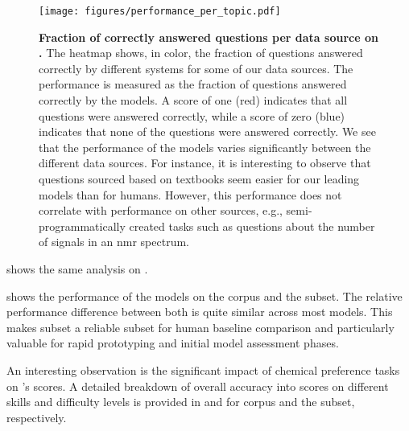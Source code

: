 \begin{figure}[htb]
    \centering
    \texttt{[image: figures/performance\_per\_topic.pdf]}
    \caption{\textbf{Fraction of correctly answered questions per data source on \chembenchmini.} The heatmap shows, in color, the fraction of questions answered correctly by different systems for some of our data sources. The performance is measured as the fraction of questions answered correctly by the models. A score of one (red) indicates that all questions were answered correctly, while a score of zero (blue) indicates that none of the questions were answered correctly.
        We see that the performance of the models varies significantly between the different data sources. For instance, it is interesting to observe that questions sourced based on textbooks seem easier for our leading models than for humans. However, this performance does not correlate with performance on other sources, e.g., semi-programmatically created tasks such as questions about the number of signals in an \gls{nmr} spectrum.
    }
    \label{fig:performance_per_topic}
\end{figure}

 shows the same analysis on \chembenchmini.

 shows the performance of the models on the \chembench corpus and the \chembenchmini subset. The relative performance difference between both is quite similar across most models. 
This makes \chembenchmini subset a reliable subset for human baseline comparison and particularly valuable for rapid prototyping and initial model assessment phases. 

An interesting observation is the significant impact of chemical preference tasks on \GPTFour's scores. A detailed breakdown of overall accuracy into scores on different skills and difficulty levels is provided in  and  for \chembench corpus and the \chembenchmini subset, respectively.


